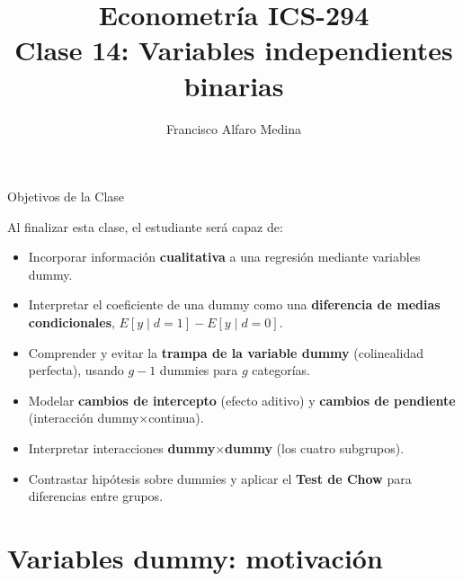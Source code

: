 \documentclass{beamer}
\title[ICS-294]{Econometría ICS-294\\ \small{Clase 14: Variables independientes binarias }}
\author{Francisco Alfaro Medina}
\institute[USM]{
	Universidad Técnica Federico Santa María\\ %
	\medskip
	\textit{francisco.alfaro@usm.cl} %
}
\date{}
\begin{document}
\begin{frame}
	\titlepage %


\end{frame}
\logo{}

\begin{frame}{Objetivos de la Clase}

Al finalizar esta clase, el estudiante será capaz de:

\begin{itemize}
    \item[\checkmark] Incorporar información \textbf{cualitativa} a una regresión mediante variables dummy.
    \item[\checkmark] Interpretar el coeficiente de una dummy como una \textbf{diferencia de medias condicionales}, $E[y\mid d=1]-E[y\mid d=0]$.
    \item[\checkmark] Comprender y evitar la \textbf{trampa de la variable dummy} (colinealidad perfecta), usando $g-1$ dummies para $g$ categorías.
    \item[\checkmark] Modelar \textbf{cambios de intercepto} (efecto aditivo) y \textbf{cambios de pendiente} (interacción dummy$\times$continua).
    \item[\checkmark] Interpretar interacciones \textbf{dummy$\times$dummy} (los cuatro subgrupos).
    \item[\checkmark] Contrastar hipótesis sobre dummies y aplicar el \textbf{Test de Chow} para diferencias entre grupos.
\end{itemize}

\end{frame}

\section{Variables dummy: motivación}
\end{document}

